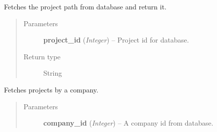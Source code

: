 \documentclass[letterpaper,10pt,english]{sphinxmanual}
\begin{document}
\begin{fulllineitems}
\label{controller:controller.project.get_project_path}
Fetches the project path from database and return it.
\begin{quote}\begin{description}
\item[{Parameters}] \leavevmode
\textbf{project\_id} (\emph{Integer}) -- Project id for database.

\item[{Return type}] \leavevmode
String

\end{description}\end{quote}

\end{fulllineitems}


\begin{fulllineitems}
\label{controller:controller.project.get_projects_by_company}
Fetches projects by a company.
\begin{quote}\begin{description}
\item[{Parameters}] \leavevmode
\textbf{company\_id} (\emph{Integer}) -- A company id from database.

\end{description}\end{quote}

\end{fulllineitems}

\end{document}
